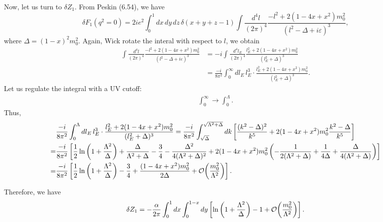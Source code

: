 \documentclass[11pt]{article}
\theoremstyle{definition}
\begin{document}
Now, let us turn to $\delta Z_1$. From Peskin (6.54), we have
\begin{equation}
    \delta F_1(q^2=0)=2ie^2\int^1_0dx\,dy\,dz\,\delta(x+y+z-1)\int\frac{d^4l}{(2\pi)^4}\frac{-l^2+2(1-4x+x^2)m_0^2}{(l^2-\Delta+i\varepsilon)^3},
\end{equation}
where $\Delta=(1-x)^2m_0^2$. Again, Wick rotate the interal with respect to $l$, we obtain
\begin{equation}
\begin{aligned}
    \int\frac{d^4l}{(2\pi)^4}\frac{-l^2+2(1-4x+x^2)m_0^2}{(l^2-\Delta+i\varepsilon)^3} &= -i\int\frac{d^4l_E}{(2\pi)^4}\frac{l_E^2+2(1-4x+x^2)m_0^2}{(l_E^2+\Delta)^3}\\
    &=\frac{-i}{8\pi^2}\int^\infty_0 dl_E\, l_E^3\cdot \frac{l_E^2+2(1-4x+x^2)m_0^2}{(l_E^2+\Delta)^3}.
\end{aligned}
\end{equation}
Let us regulate the integral with a UV cutoff:
\begin{equation}
    \begin{aligned}
        \int^\infty_0\to\int^\Lambda_0.
    \end{aligned}
\end{equation}
Thus,
\begin{equation}
    \begin{aligned}
        &\frac{-i}{8\pi^2}\int^\Lambda_0 dl_E\, l_E^3\cdot \frac{l_E^2+2(1-4x+x^2)m_0^2}{(l_E^2+\Delta)^3}= \frac{-i}{8\pi^2}\int^{\sqrt{\Lambda^2+\Delta}}_{\sqrt{\Delta}} dk\left[\frac{(k^2-\Delta)^2}{k^5} + 2(1-4x+x^2)m_0^2\frac{k^2-\Delta}{k^5}\right]\\
        =&\frac{-i}{8\pi^2}\left[\frac{1}{2}\ln\left(1+\frac{\Lambda^2}{\Delta}\right)+\frac{\Delta}{\Lambda^2+\Delta}-\frac{3}{4} - \frac{\Delta^2}{4(
        \Lambda^2+\Delta)^2} + 2(1-4x+x^2)m_0^2\left(-\frac{1}{2(\Lambda^2+\Delta)}+\frac{1}{4\Delta} + \frac{\Delta}{4(\Lambda^2+\Delta)}\right)\right]\\
        =&\frac{-i}{8\pi^2}\left[\frac{1}{2}\ln\left(1+\frac{\Lambda^2}{\Delta}\right)-\frac{3}{4}+\frac{(1-4x+x^2)m_0^2}{2\Delta}+\order{\frac{m_0^2}{\Lambda^2}}\right]. 
    \end{aligned}
\end{equation}

Therefore, we have
\begin{equation}
    \delta Z_1 = -\frac{\alpha}{2\pi}\int^1_0dx\int^{1-x}_0dy\left[\ln\left(1+\frac{\Lambda^2}{\Delta}\right)-1+\order{\frac{m_0^2}{\Lambda^2}}\right].
\end{equation}
\end{document}

